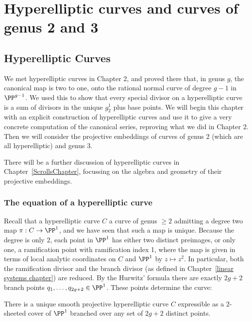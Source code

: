 

\chapter{Hyperelliptic curves and curves of genus 2 and 3}\label{genus 2 and 3 chapter}

\section{Hyperelliptic Curves}\label{hyperelliptic}
 
We met hyperelliptic curves in Chapter 2, and proved there that, in genus $g$, the canonical
map is two to one, onto the rational normal curve of degree $g-1$ in $\PP^{g-1}$. We used this to show that every special divisor on a hyperelliptic curve is a sum of divisors in the 
unique $g^1_2$ plus base points. We will begin this chapter with an explicit construction of hyperelliptic curves and use it to give a very concrete computation of the canonical series, reproving what we did in Chapter 2. Then we will consider the projective embeddings of curves of genus 2 (which are all hyperelliptic) and genus 3.
 
There will be a further discussion of hyperelliptic curves in Chapter~\ref{ScrollsChapter}, focussing on the algebra and geometry of their projective embeddings. 
  
 \subsection{The equation of a hyperelliptic curve}
 
Recall that a hyperelliptic curve $C$ a curve of genus $\geq 2$ admitting a degree two map $\pi : C \to \PP^1$, and we have seen that such a map is unique. Because the degree is only 2, each point in $\PP^1$ has either two distinct preimages, or only one, a ramification point with ramification index 1, where the map is given in terms of local analytic coordinates on $C$ and $\PP^1$ by $z \mapsto z^2$. In particular, both the ramification divisor and the branch divisor (as defined in Chapter~\ref{linear systems chapter}) are reduced. By the Hurwitz' formula there are exactly $2g+2$ branch points $q_1,\dots,q_{2g+2} \in \PP^1$. These points determine the curve:
 
\begin{theorem}\label{hyperelliptic existence}
There is a unique smooth projective hyperelliptic curve $C$ expressible as a 2-sheeted cover of $\PP^1$ branched over any set of $2g+2$ distinct points.
\end{theorem}

